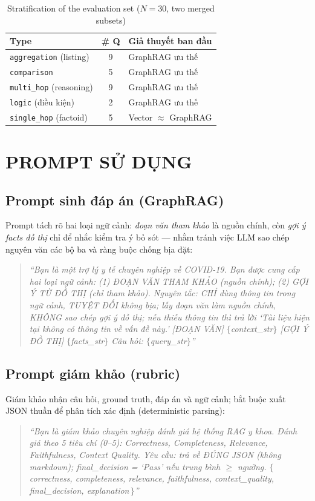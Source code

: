 \documentclass[conference]{IEEEtran}
\begin{document}
\begin{table}[!t]
\caption{Stratification of the evaluation set ($N=30$, two merged subsets)}
\label{tab:dataset}
\centering
\footnotesize
\begin{tabular}{@{}p{} c p{}@{}}
\toprule
\textbf{Type} & \textbf{\# Q} & \textbf{Giả thuyết ban đầu} \\
\midrule
\texttt{aggregation} (listing) & 9 & GraphRAG ưu thế \\
\texttt{comparison} & 5 & GraphRAG ưu thế \\
\texttt{multi\_hop} (reasoning) & 9 & GraphRAG ưu thế \\
\texttt{logic} (điều kiện) & 2 & GraphRAG ưu thế \\
\texttt{single\_hop} (factoid) & 5 & Vector $\approx$ GraphRAG \\
\bottomrule
\end{tabular}
\end{table}

\section{PROMPT SỬ DỤNG}

\subsection{Prompt sinh đáp án (GraphRAG)}
Prompt tách rõ hai loại ngữ cảnh: \emph{đoạn văn tham khảo} là nguồn chính, còn \emph{gợi ý facts đồ thị} chỉ để nhắc kiểm tra ý bỏ sót --- nhằm tránh việc LLM sao chép nguyên văn các bộ ba và ràng buộc chống bịa đặt:
\begin{quote}\footnotesize\itshape
``Bạn là một trợ lý y tế chuyên nghiệp về COVID-19. Bạn được cung cấp hai loại ngữ cảnh: (1) ĐOẠN VĂN THAM KHẢO (nguồn chính); (2) GỢI Ý TỪ ĐỒ THỊ (chỉ tham khảo). Nguyên tắc: CHỈ dùng thông tin trong ngữ cảnh, TUYỆT ĐỐI không bịa; lấy đoạn văn làm nguồn chính, KHÔNG sao chép gợi ý đồ thị; nếu thiếu thông tin thì trả lời `Tài liệu hiện tại không có thông tin về vấn đề này.' [ĐOẠN VĂN] $\{$context\_str$\}$ [GỢI Ý ĐỒ THỊ] $\{$facts\_str$\}$ Câu hỏi: $\{$query\_str$\}$''
\end{quote}

\subsection{Prompt giám khảo (rubric)}
Giám khảo nhận câu hỏi, ground truth, đáp án và ngữ cảnh; bắt buộc xuất JSON thuần để phân tích xác định (deterministic parsing):
\begin{quote}\footnotesize\itshape
``Bạn là giám khảo chuyên nghiệp đánh giá hệ thống RAG y khoa. Đánh giá theo 5 tiêu chí (0--5): Correctness, Completeness, Relevance, Faithfulness, Context Quality. Yêu cầu: trả về ĐÚNG JSON (không markdown); final\_decision = `Pass' nếu trung bình $\geq$ ngưỡng. $\{$\,correctness, completeness, relevance, faithfulness, context\_quality, final\_decision, explanation\,$\}$''
\end{quote}
\end{document}
